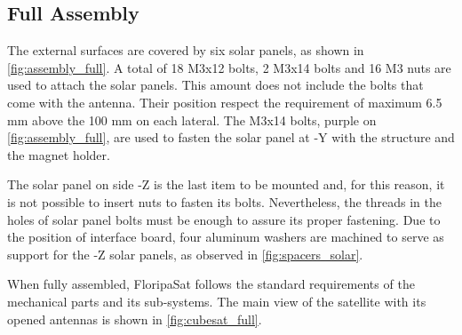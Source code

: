 \subsection{Full Assembly}

The external surfaces are covered by six solar panels, as shown in \autoref{fig:assembly_full}. A total of 18 M3x12 bolts, 2 M3x14 bolts and 16 M3 nuts are used to attach the solar panels. This amount does not include the bolts that come with the antenna. Their position respect the requirement of maximum 6.5 mm above the 100 mm on each lateral. The M3x14 bolts, purple on \autoref{fig:assembly_full}, are used to fasten the solar panel at -Y with the structure and the magnet holder.  


The solar panel on side -Z is the last item to be mounted and, for this reason, it is not possible to insert nuts to fasten its bolts. Nevertheless, the threads in the holes of solar panel bolts must be enough to assure its proper fastening. Due to the position of interface board, four aluminum washers are machined to serve as support for the -Z solar panels, as observed in \autoref{fig:spacers_solar}.


When fully assembled, FloripaSat follows the standard requirements of the mechanical parts and its sub-systems. The main view of the satellite with its opened antennas is shown in \autoref{fig:cubesat_full}. 

